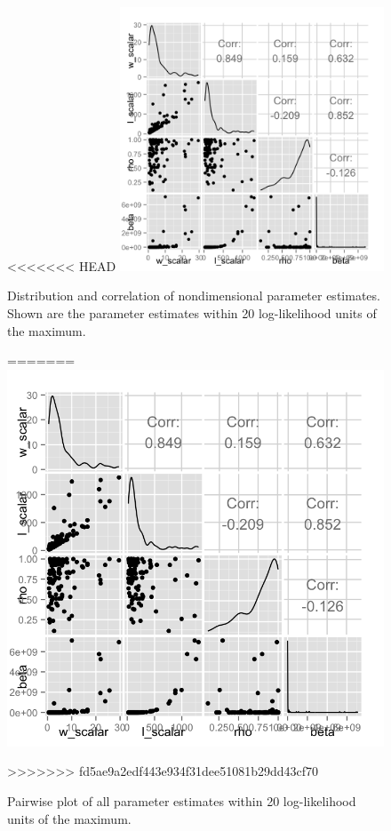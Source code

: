 \documentclass[12pt,reqno,final,pdftex]{amsart}\usepackage[]{graphicx}\usepackage[]{color}
\newenvironment{knitrout}{}{} %
\theoremstyle{plain}
\numberwithin{equation}{part}
\begin{document}
\begin{knitrout}\scriptsize
{}\color{fgcolor}\begin{figure}

<<<<<<< HEAD
\includegraphics[width=0.7\textwidth]{figure/nondim-fig-1} \hfill{}

\caption[Distribution and correlation of nondimensional parameter estimates]{Distribution and correlation of nondimensional parameter estimates. Shown are the parameter estimates within 20 log-likelihood units of the maximum.}\label{fig:nondim-fig}
=======
\includegraphics[width=\linewidth]{figure/nondim-fig-1} \hfill{}

\caption[Pairwise plot of all parameter estimates within 20 log-likelihood units of the maximum]{Pairwise plot of all parameter estimates within 20 log-likelihood units of the maximum.}\label{fig:nondim-fig}
>>>>>>> fd5ae9a2edf443e934f31dee51081b29dd43cf70
\end{figure}


\end{knitrout}
\end{document}
